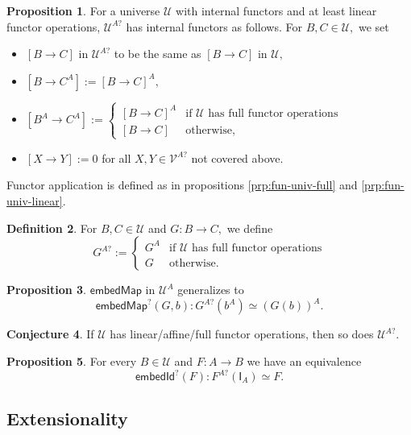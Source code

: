\documentclass[a4paper]{article}
\theoremstyle{definition}
\newtheorem{definition}{Definition}[section]
\newtheorem{proposition}[definition]{Proposition}
\newtheorem{conjecture}[definition]{Conjecture}
\theoremstyle{remark}
\renewcommand{\equiv}{\simeq}
\newcommand{\U}{\mathcal{U}}
\newcommand{\V}{\mathcal{V}}
\newcommand{\nm}{\mathsf}
\newcommand{\combinator}{\nm}
\newcommand{\idFun}{\combinator{I}}
\begin{document}
\begin{proposition}
  For a universe $\U$ with internal functors and at least linear functor operations,
  $\U^{A?}$ has internal functors as follows. For $B,C \in \U,$ we set
  \begin{itemize}
    \item $[B \to C]$ in $\U^{A?}$ to be the same as $[B \to C]$ in $\U,$
    \item $[B \to C^A] := [B \to C]^A,$
    \item $[B^A \to C^A] := \begin{cases}
      [B \to C]^A & \text{if $\U$ has full functor operations}\\
      [B \to C]   & \text{otherwise,}
    \end{cases}$
    \item $[X \to Y] := 0$ for all $X,Y \in \V^{A?}$ not covered above.
  \end{itemize}
  Functor application is defined as in propositions \ref{prp:fun-univ-full} and
  \ref{prp:fun-univ-linear}.
\end{proposition}

\begin{definition}
  For $B,C \in \U$ and $G : B \to C,$ we define
  \[G^{A?} := \begin{cases}
    G^A & \text{if $\U$ has full functor operations}\\
    G   & \text{otherwise.}
  \end{cases}\]
\end{definition}

\begin{proposition}
  $\nm{embedMap}$ in $\U^A$ generalizes to
  \[\nm{embedMap}^?(G,b) : G^{A?}(b^A) \equiv (G(b))^A.\]
\end{proposition}

\begin{conjecture}
  \label{conj:fun-univ-linear}
  If $\U$ has linear/affine/full functor operations, then so does $\U^{A?}.$
\end{conjecture}

\begin{proposition}
  For every $B \in \U$ and $F : A \to B$ we have an equivalence
  \[\nm{embedId}^?(F) : F^{A?}(\idFun_A) \equiv F.\]
\end{proposition}

\subsection{Extensionality}
\label{sec:extensionality}
\end{document}
